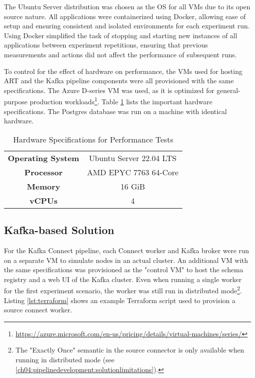 The Ubuntu Server distribution was chosen as the \ac{OS} for all \ac{VM}s due to its open source nature. All applications were containerized using Docker, allowing ease of setup and ensuring consistent and isolated environments for each experiment run. Using Docker simplified the task of stopping and starting new instances of all applications between experiment repetitions, ensuring that previous measurements and actions did not affect the performance of subsequent runs.

To control for the effect of hardware on performance, the \ac{VM}s used for hosting \ac{ART} and the Kafka pipeline components were all provisioned with the same specifications. The Azure D-series \ac{VM} was used, as it is optimized for general-purpose production workloads\footnote{\url{https://azure.microsoft.com/en-us/pricing/details/virtual-machines/series/}}. Table \ref{tab:hardwarespecs} lists the important hardware specifications. The Postgres database was run on a machine with identical hardware.


\begin{table}
    \centering
    \begin{tabular}{|cc|}
        \hline
         \textbf{Operating System} & Ubuntu Server 22.04 LTS \\
         \textbf{Processor} & AMD EPYC 7763 64-Core \\
         \textbf{Memory} & 16 GiB \\
         \textbf{vCPUs} & 4 \\
        \hline
    \end{tabular}
    \caption{Hardware Specifications for Performance Tests}
    \label{tab:hardwarespecs}
\end{table}





\subsection{Kafka-based Solution}
For the Kafka Connect pipeline, each Connect worker and Kafka broker were run on a separate \ac{VM} to simulate nodes in an actual cluster. An additional \ac{VM} with the same specifications was provisioned as the "control \ac{VM}" to host the schema registry and a web UI of the Kafka cluster. Even when running a single worker for the first experiment scenario, the worker was still run in distributed mode\footnote{The "Exactly Once" semantic in the source connector is only available when running in distributed mode (see \ref{ch04:pipelinedevelopment:solutionlimitations}).}. Listing \ref{lst:terraform} shows an example Terraform script used to provision a source connect worker.

